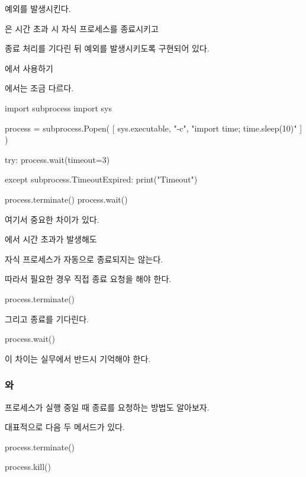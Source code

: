  예외를 발생시킨다.

은 시간 초과 시 자식 프로세스를 종료시키고

종료 처리를 기다린 뒤 예외를 발생시키도록 구현되어 있다.

\begin{dhknote}
\begin{dhksmry}[centered]
에서 사용하기
\end{dhksmry}
\end{dhknote}

에서는 조금 다르다.

\begin{dhkcode}
import subprocess
import sys

process = subprocess.Popen(
    [
        sys.executable,
        "-c",
        "import time; time.sleep(10)"
    ]
)

try:
    process.wait(timeout=3)

except subprocess.TimeoutExpired:
    print("Timeout")

    process.terminate()
    process.wait()
\end{dhkcode}

여기서 중요한 차이가 있다.

에서 시간 초과가 발생해도

자식 프로세스가 자동으로 종료되지는 않는다.

따라서 필요한 경우 직접 종료 요청을 해야 한다.

\begin{dhkzsh}
process.terminate()
\end{dhkzsh}

그리고 종료를 기다린다.

\begin{dhkzsh}
process.wait()
\end{dhkzsh}

이 차이는 실무에서 반드시 기억해야 한다.

\subsubsection{와 }

프로세스가 실행 중일 때 종료를 요청하는 방법도 알아보자.

대표적으로 다음 두 메서드가 있다.

\begin{dhkzsh}
process.terminate()

process.kill()
\end{dhkzsh}

